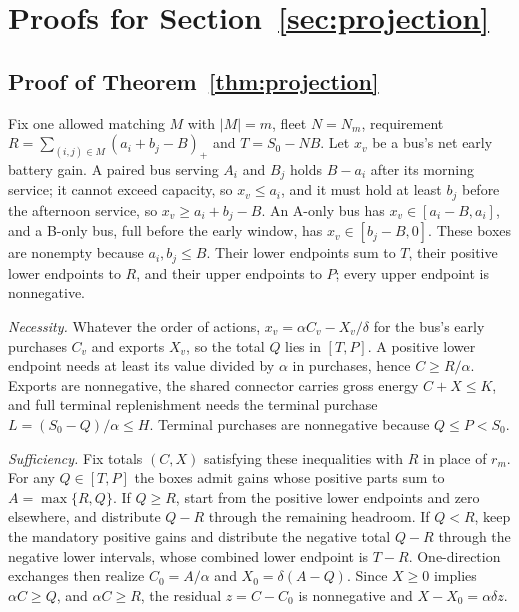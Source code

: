 \section{Proofs for Section~\ref{sec:projection}}\label{app:projection}

\subsection{Proof of Theorem~\ref{thm:projection}}
Fix one allowed matching $M$ with $|M|=m$, fleet $N=N_m$, requirement
$R=\sum_{(i,j)\in M}(a_i+b_j-B)_+$ and $T=S_0-NB$. Let $x_v$ be a bus's net early
battery gain. A paired bus serving $A_i$ and $B_j$ holds $B-a_i$ after its
morning service; it cannot exceed capacity, so $x_v\le a_i$, and it must hold at
least $b_j$ before the afternoon service, so $x_v\ge a_i+b_j-B$. An A-only bus
has $x_v\in[a_i-B,a_i]$, and a B-only bus, full before the early window, has
$x_v\in[b_j-B,0]$. These boxes are nonempty because $a_i,b_j\le B$. Their lower
endpoints sum to $T$, their positive lower endpoints to $R$, and their upper
endpoints to $P$; every upper endpoint is nonnegative.

\emph{Necessity.} Whatever the order of actions, $x_v=\alpha C_v-X_v/\delta$ for
the bus's early purchases $C_v$ and exports $X_v$, so the total $Q$ lies in
$[T,P]$. A positive lower endpoint needs at least its value divided by $\alpha$
in purchases, hence $C\ge R/\alpha$. Exports are nonnegative, the shared
connector carries gross energy $C+X\le K$, and full terminal replenishment
needs the terminal purchase $L=(S_0-Q)/\alpha\le H$. Terminal purchases are
nonnegative because $Q\le P<S_0$.

\emph{Sufficiency.} Fix totals $(C,X)$ satisfying these inequalities with $R$ in
place of $r_m$. For any $Q\in[T,P]$ the boxes admit gains whose positive parts
sum to $A=\max\{R,Q\}$. If $Q\ge R$, start from the positive lower endpoints and
zero elsewhere, and distribute $Q-R$ through the remaining headroom. If $Q<R$,
keep the mandatory positive gains and distribute the negative total $Q-R$
through the negative lower intervals, whose combined lower endpoint is $T-R$.
One-direction exchanges then realize $C_0=A/\alpha$ and $X_0=\delta(A-Q)$. Since
$X\ge0$ implies $\alpha C\ge Q$, and $\alpha C\ge R$, the residual $z=C-C_0$ is
nonnegative and $X-X_0=\alpha\delta z$.

